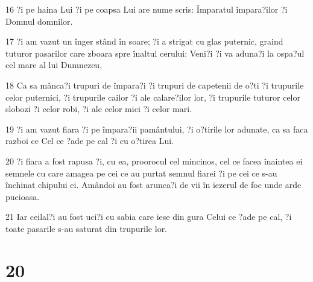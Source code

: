 \par 16 ?i pe haina Lui ?i pe coapsa Lui are nume scris: Împaratul împara?ilor ?i Domnul domnilor.
\par 17 ?i am vazut un înger stând în soare; ?i a strigat cu glas puternic, graind tuturor pasarilor care zboara spre înaltul cerului: Veni?i ?i va aduna?i la ospa?ul cel mare al lui Dumnezeu,
\par 18 Ca sa mânca?i trupuri de împara?i ?i trupuri de capetenii de o?ti ?i trupurile celor puternici, ?i trupurile cailor ?i ale calare?ilor lor, ?i trupurile tuturor celor slobozi ?i celor robi, ?i ale celor mici ?i celor mari.
\par 19 ?i am vazut fiara ?i pe împara?ii pamântului, ?i o?tirile lor adunate, ca sa faca razboi ce Cel ce ?ade pe cal ?i cu o?tirea Lui.
\par 20 ?i fiara a fost rapusa ?i, cu ea, proorocul cel mincinos, cel ce facea înaintea ei semnele cu care amagea pe cei ce au purtat semnul fiarei ?i pe cei ce s-au închinat chipului ei. Amândoi au fost arunca?i de vii în iezerul de foc unde arde pucioasa.
\par 21 Iar ceilal?i au fost uci?i cu sabia care iese din gura Celui ce ?ade pe cal, ?i toate pasarile s-au saturat din trupurile lor.

\chapter{20}

